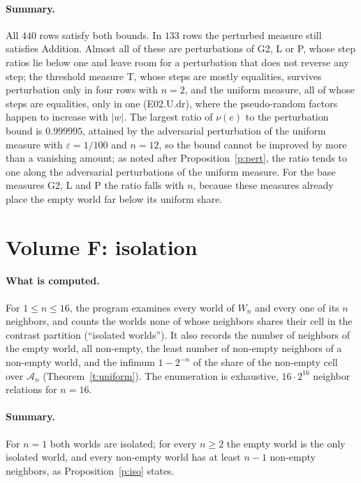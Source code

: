 \documentclass{situationist-preprint}
\begin{document}
\paragraph{Summary.} All $440$ rows satisfy both bounds. In $133$ rows the perturbed measure still satisfies Addition. Almost all of these are perturbations of G2, L or P, whose step ratios lie below one and leave room for a perturbation that does not reverse any step; the threshold measure T, whose steps are mostly equalities, survives perturbation only in four rows with $n = 2$, and the uniform measure, all of whose steps are equalities, only in one (E02.U.dr), where the pseudo-random factors happen to increase with $|w|$. The largest ratio of $\nu(e)$ to the perturbation bound is $0.999995$, attained by the adversarial perturbation of the uniform measure with $\varepsilon = 1/100$ and $n = 12$, so the bound cannot be improved by more than a vanishing amount; as noted after Proposition~\ref{p:pert}, the ratio tends to one along the adversarial perturbations of the uniform measure. For the base measures G2, L and P the ratio falls with $n$, because these measures already place the empty world far below its uniform share.



\section{Volume F: isolation}\label{app:f}

\paragraph{What is computed.} For $1 \leq n \leq 16$, the program examines every world of $W_n$ and every one of its $n$ neighbors, and counts the worlds none of whose neighbors shares their cell in the contrast partition (\enquote{isolated worlds}). It also records the number of neighbors of the empty world, all non-empty, the least number of non-empty neighbors of a non-empty world, and the infimum $1 - 2^{-n}$ of the share of the non-empty cell over $\mathcal{A}_n$ (Theorem~\ref{t:uniform}). The enumeration is exhaustive, $16 \cdot 2^{16}$ neighbor relations for $n = 16$.

\paragraph{Summary.} For $n = 1$ both worlds are isolated; for every $n \geq 2$ the empty world is the only isolated world, and every non-empty world has at least $n-1$ non-empty neighbors, as Proposition~\ref{p:iso} states.
\end{document}
